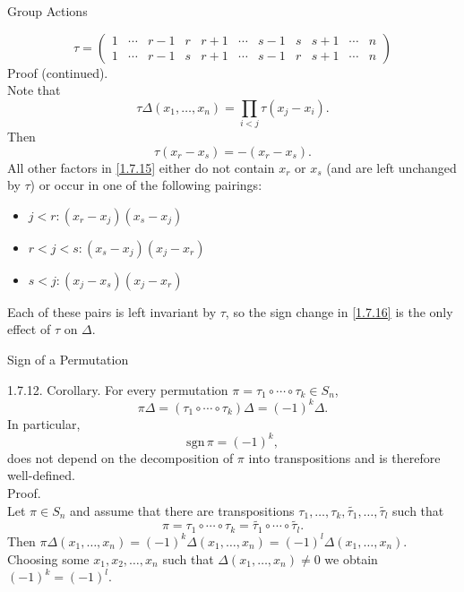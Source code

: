 \documentclass[smaller,hyperref={CJKbookmarks=true}]{beamer}
\newcommand{\myseries}[2]{$#1_1,#1_2,\dots,#1_#2$}
\begin{document}
\begin{frame}{Group Actions}
\begin{spacing}{1.1}
\begin{equation*}
\tau=\begin{pmatrix}
       1 & \cdots & r-1 & r & r+1 & \cdots & s-1 & s & s+1 & \cdots & n \\
        1& \cdots & r-1 & s & r+1 & \cdots & s-1 & r & s+1 & \cdots & n
     \end{pmatrix}
\end{equation*}
\newpage
\alert{Proof (continued).}\\
Note that
\[\tau\Delta(x_1,\ldots,x_n)=\prod_{i<j}\tau(x_j-x_i).\]
Then
\begin{equation}\label{1.7.16}
  \tau(x_r-x_s)=-(x_r-x_s).
\end{equation}
All other factors in \eqref{1.7.15} either do not contain $x_r$ or $x_s$ (and are left unchanged by $\tau$) or occur in one of the following pairings:
\begin{itemize}
  \item $j<r:(x_r-x_j)(x_s-x_j)$
  \item $r<j<s:(x_s-x_j)(x_j-x_r)$
  \item $s<j:(x_j-x_s)(x_j-x_r)$
\end{itemize}
Each of these pairs is left invariant by $\tau$, so the sign change in \eqref{1.7.16} is the only ef{}fect of $\tau$ on $\Delta$.
\end{spacing}
\end{frame}
\begin{frame}[t,shrink]{Sign of a Permutation}
\begin{spacing}{1}
\alert{1.7.12. Corollary.} For every permutation $\pi=\tau_1\circ\cdots\circ\tau_k\in S_n$,
\[\pi\Delta=(\tau_1\circ\cdots\circ\tau_k)\Delta=(-1)^k\Delta.\]
In particular,
\[\text{sgn}\,\pi=(-1)^k,\]
does not depend on the decomposition of $\pi$ into transpositions and is
therefore well-defined.\\[9pt]
\alert{Proof.}\\
Let $\pi\in S_n$ and assume that there are transpositions $\tau_1,\ldots,\tau_k,\widetilde{\tau_1},\ldots,\widetilde{\tau_l}$ such that
\[\pi=\tau_1\circ\cdots\circ\tau_k=\widetilde{\tau_1}\circ\cdots\circ\widetilde{\tau_l}.\]
Then $\pi\Delta(x_1,\ldots,x_n)=(-1)^k\Delta(x_1,\ldots,x_n)=(-1)^l\Delta(x_1,\ldots,x_n)$. Choosing some \myseries{x}{n} such that $\Delta(x_1,\ldots,x_n)\neq0$ we obtain $(-1)^k=(-1)^l$.
\end{spacing}
\end{frame}
\end{document}
